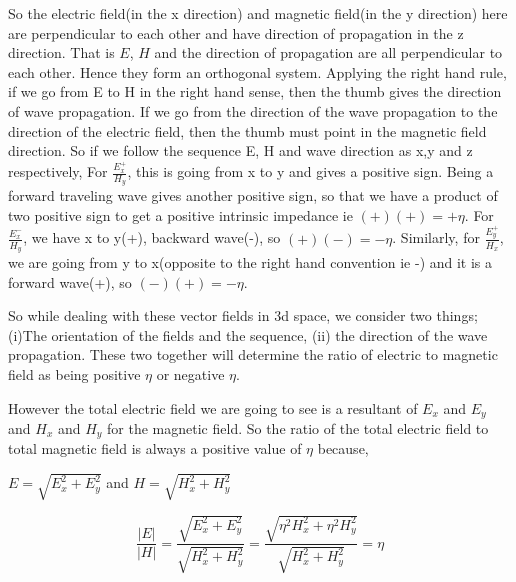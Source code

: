 So the electric field(in the x direction) and magnetic field(in the y direction) here are perpendicular to each other and have direction of propagation in the z direction. That is $E$, $H$ and the direction of propagation are all perpendicular to each other. Hence they form an orthogonal system. Applying the right hand rule, if we go from E to H in the right hand sense, then the thumb gives the direction of wave propagation. If we go from the direction of the wave propagation to the direction of the electric field, then the thumb must point in the magnetic field direction.
So if we follow the sequence E, H and wave direction as x,y and z respectively, For $\frac{E_x^+}{H_y}$, this is going from x to y and gives a positive sign. Being a forward traveling wave gives another positive sign, so that we have a product of two positive sign to get a positive intrinsic impedance ie $(+)(+) = +\eta$. For $\frac{E_x^-}{H_y}$, we have x to y(+), backward wave(-), so $(+)(-) = -\eta$. Similarly, for $\frac{E_y^+}{H_x}$, we are going from y to x(opposite to the right hand convention ie -) and it is a forward wave(+), so $(-)(+) = -\eta$.

So while dealing with these vector fields in 3d space, we consider two things; (i)The orientation of the fields and the sequence, (ii) the direction of the wave propagation. These two together will determine the ratio of electric to magnetic field as being positive $\eta$ or negative $\eta$.

However the total electric field we are going to see is a resultant of $E_x$ and $E_y$ and $H_x$ and $H_y$ for the magnetic field. So the ratio of the total electric field to total magnetic field is always a positive value of $\eta$ because,
\begin{center}
$E = \sqrt{E_x^2 + E_y^2}$ and $H = \sqrt{H_x^2 + H_y^2}$
\end{center}
\begin{dmath*}
\frac{|E|}{|H|}=\frac{\sqrt{E_x^2 + E_y^2}}{\sqrt{H_x^2 + H_y^2}} = \frac{\sqrt{\eta ^2H_x^2 + \eta ^2H_y^2}}{\sqrt{H_x^2 + H_y^2}}=\eta
\end{dmath*}

